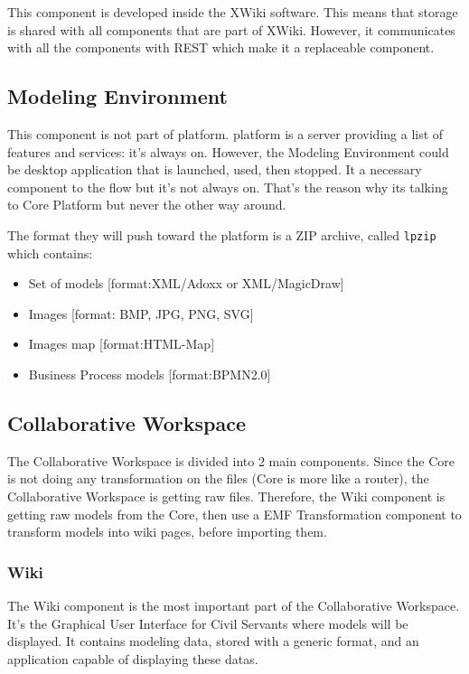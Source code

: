 \documentclass{learnpad}
\begin{document}
This component is developed inside the XWiki software.  This means that storage
is shared with all components that are part of XWiki.  However, it communicates
with all the components with REST which make it a replaceable component.

\subsection{Modeling Environment}
This component is not part of \learnpad platform.  \learnpad platform is a
server providing a list of features and services: it's always on.  However, the
Modeling Environment could be desktop application that is launched, used, then
stopped.  It a necessary component to the \learnpad flow but it's not always on.
That's the reason why its talking to \learnpad Core Platform but never the other
way around.

The format they will push toward the \learnpad platform is a ZIP archive, called \verb+lpzip+ which contains:
\begin{itemize}
	\item Set of models [format:XML/Adoxx or XML/MagicDraw]
	\item Images [format: BMP, JPG, PNG, SVG]
	\item Images map [format:HTML-Map]
	\item Business Process models [format:BPMN2.0]
\end{itemize}

\subsection{Collaborative Workspace}
The Collaborative Workspace is divided into 2 main components.  Since the
\learnpad Core is not doing any transformation on the files (\learnpad Core is
more like a router), the Collaborative Workspace is getting raw files.
Therefore, the Wiki component is getting raw models from the \learnpad Core,
then use a EMF Transformation component to transform models into wiki pages,
before importing them.

\subsubsection{Wiki}
The Wiki component is the most important part of the Collaborative Workspace.
It's the Graphical User Interface for Civil Servants where models will be
displayed.  It contains modeling data, stored with a generic format, and an
application capable of displaying these datas.
\end{document}
